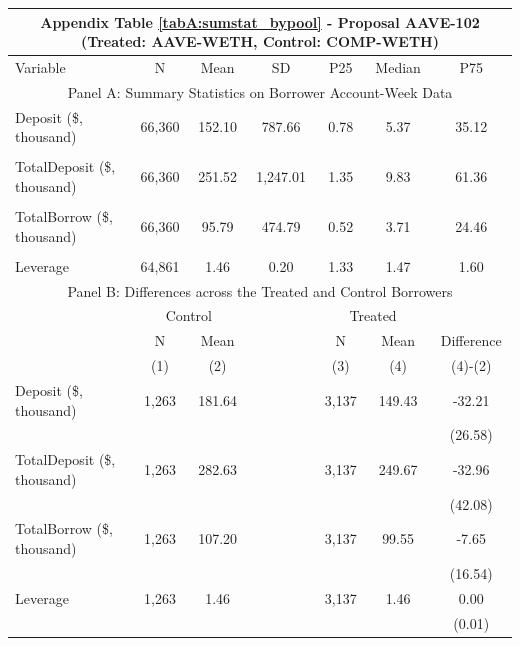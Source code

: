 
\clearpage
\newpage
\begin{table}[ht!]
\footnotesize 

\centering
\def\sym#1{\ifmmode^{#1}\else\(^{#1}\)\fi}


\begin{tabular*}{\linewidth}{@{\extracolsep{\fill}}lcccccc }
      \multicolumn{7}{c}{Appendix Table \ref{tabA:sumstat_bypool} - Proposal AAVE-102 (Treated: AAVE-WETH, Control: COMP-WETH)} \\
    \toprule
     Variable  &N & Mean & SD & P25 & Median & P75 \\
     \midrule
    \multicolumn{7}{c}{Panel A: Summary Statistics on Borrower Account-Week Data} \\
    \midrule
    Deposit (\$, thousand) & 66,360 & 152.10 & 787.66 & 0.78  & 5.37  & 35.12 \\
          &       &       &       &       &       &  \\
    TotalDeposit (\$, thousand) & 66,360 & 251.52 & 1,247.01 & 1.35  & 9.83  & 61.36 \\
          &       &       &       &       &       &  \\
    TotalBorrow (\$, thousand) & 66,360 & 95.79 & 474.79 & 0.52  & 3.71  & 24.46 \\
          &       &       &       &       &       &  \\
    Leverage & 64,861 & 1.46  & 0.20  & 1.33  & 1.47  & 1.60 \\
    \midrule
        \multicolumn{7}{c}{Panel B: Differences across the Treated and Control Borrowers} \\
\midrule
          & \multicolumn{2}{c}{Control} &       & \multicolumn{2}{c}{Treated} &  \\
\cmidrule{2-3}\cmidrule{5-6}          & N & Mean &       & N & Mean & Difference \\
\cmidrule{2-3}\cmidrule{5-6}          & (1) & (2) &       & (3) & (4) & (4)-(2) \\
\cmidrule{2-7}    Deposit (\$, thousand) & 1,263 & 181.64 &       & 3,137 & 149.43 & -32.21 \\
          &       &       &       &       &       & (26.58) \\
    TotalDeposit (\$, thousand) & 1,263 & 282.63 &       & 3,137 & 249.67 & -32.96 \\
          &       &       &       &       &       & (42.08) \\
    TotalBorrow (\$, thousand) & 1,263 & 107.20 &       & 3,137 & 99.55 & -7.65 \\
          &       &       &       &       &       & (16.54) \\
    Leverage & 1,263 & 1.46  &       & 3,137 & 1.46  & 0.00 \\
          &       &       &       &       &       & (0.01) \\
    \bottomrule


\end{tabular*}
\end{table}

